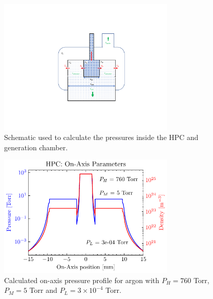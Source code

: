 \begin{figure}
	\centering
	\includegraphics[width=0.75\textwidth]{figures/chap3/HPC_pressure_schematic.pdf}
	\caption{Schematic used to calculate the pressures inside the HPC and generation chamber.}
	\label{fig:HPC_pressure_schematic}
\end{figure}

\begin{figure}
	\centering
	\includegraphics[width=0.75\textwidth]{figures/chap3/HPC_on-axis-pressure.pdf}
	\caption{Calculated on-axis pressure profile for argon with $P_H = 760$ Torr, $P_M = 5$ Torr and $P_L = 3 \times 10^{-4}$ Torr.}
	\label{fig:HPC_on-axis-pressure}
\end{figure}

